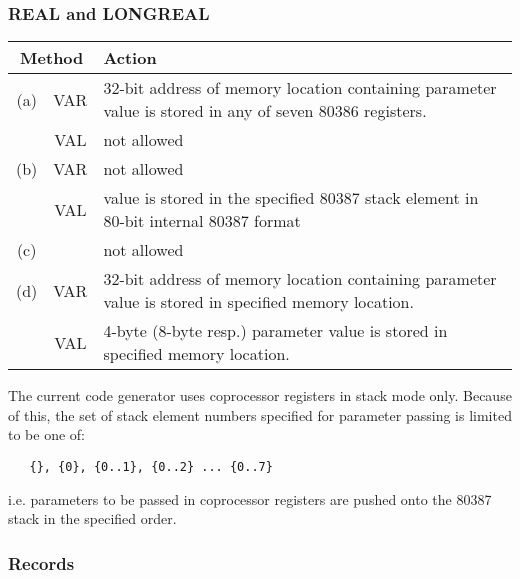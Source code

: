 \subsubsection{REAL and LONGREAL}

\begin{tabular}{|c|c|p{8cm}|} \hline
\multicolumn{2}{|c|}{Method} & Action \\ \hline
(a) & VAR & 32-bit address of memory location containing parameter
            value is stored in any of seven 80386 registers.       \\
    & VAL & not allowed                                            \\ \hline
(b) & VAR &  not allowed                                           \\
    & VAL & value is stored in the specified 80387 stack element
            in 80-bit internal 80387 format                        \\ \hline
(c) & & not allowed                                                \\ \hline
(d) & VAR & 32-bit address of memory location containing parameter
         value is stored in specified memory location.             \\
    & VAL & 4-byte (8-byte resp.) parameter value is stored
         in specified memory location.                             \\ \hline
\end{tabular}

   The current code generator uses coprocessor registers in stack
 mode only. Because of this, the set of stack element numbers specified
 for parameter passing is limited to be one of:
\begin{verbatim}
   {}, {0}, {0..1}, {0..2} ... {0..7}
\end{verbatim}

   i.e. parameters to be passed in coprocessor registers are
 pushed onto the 80387 stack in the specified order.

\subsubsection{Records}

